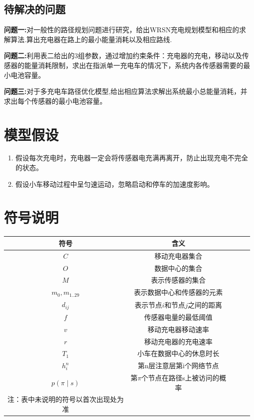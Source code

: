 \documentclass{whutmod}
\begin{document}
\subsection{待解决的问题}
\textbf{问题一:}对一般性的路径规划问题进行研究，给出WRSN充电规划模型和相应的求解算法.算出充电器在路上的最小能量消耗以及相应路线.

\textbf{问题二:}利用表二给出的3组参数，通过增加约束条件：充电器的充电，移动以及传感器的能量消耗限制，求出在指派单一充电车的情况下，系统内各传感器需要的最小电池容量。

\textbf{问题三:}对于多充电车路径优化模型,给出相应算法求解出系统最小总能量消耗，并求出每个传感器的最小电池容量。


\section{模型假设}
\begin{enumerate}
	\item 假设每次充电时，充电器一定会将传感器电充满再离开，防止出现充电不完全的状态。
	\item 假设小车移动过程中呈匀速运动，忽略启动和停车的加速度影响。
\end{enumerate}


\section{符号说明}
\begin{center}
	\begin{tabular}{ccccc}
		\toprule[1.5pt]
		符号 & 含义\\
		\midrule[1pt]
		$C$ & 移动充电器集合\\
		$O$& 数据中心的集合\\
		$M$& 表示传感器的集合\\
		$m_0,m_{1..29}$ &表示数据中心和传感器的元素\\
		$d_{ij}$&表示节点$i$和节点$j$之间的距离\\
		$f$ & 传感器电量的最低阈值\\
		$v$ & 移动充电器移动速率\\
		$r$ & 移动充电器的充电速率\\
		$T_1$&小车在数据中心的休息时长\\
		$h_{i}^{n}$&第n层注意层第i个网络节点\\
		$p(\pi \mid s)$&第$\pi$个节点在路径s上被访问的概率\\
		\bottomrule[1.5pt]
		注：表中未说明的符号以首次出现处为准
	\end{tabular}
\end{center}
\end{document}
